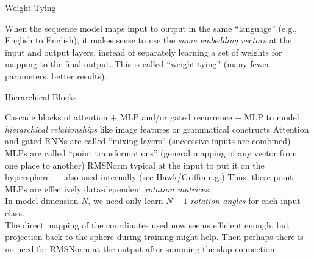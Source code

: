 \begin{slide}[\slideopts]{Weight Tying}

  When the sequence model maps input to output in the same ``language'' (e.g., English to English),
  it makes sense to use the \emph{same embedding vectors} at the input and output layers, instead
  of separately learning a set of weights for mapping to the final output.
  This is called ``weight tying'' (many fewer parameters, better results).

\end{slide}

\begin{slide}[\slideopts]{Hierarchical Blocks}
\begin{itemize}
  \mpitem Cascade blocks of attention + MLP and/or gated recurrence + MLP to model \emph{hierarchical relationships} like image features or grammatical constructs
  \mpitem Attention and gated RNNs are called ``mixing layers'' (successive inputs are combined)
  \mpitem MLPs are called ``point transformations'' (general mapping of any vector from one place to another)
  \mpitem RMSNorm typical at the input to put it on the hypersphere --- also used internally (see Hawk/Griffin e.g.)
  \mpitem Thus, these point MLPs are effectively data-dependent \emph{rotation matrices}.\\
  In model-dimension $N$, we need only learn $N-1$ \emph{rotation angles} for each input class.\\
  The direct mapping of the coordinates used now seems efficient enough, but projection back to the sphere
  during training might help.  Then perhaps there is no need for RMSNorm at the output after summing the skip
  connection.
\end{itemize}
\end{slide}







